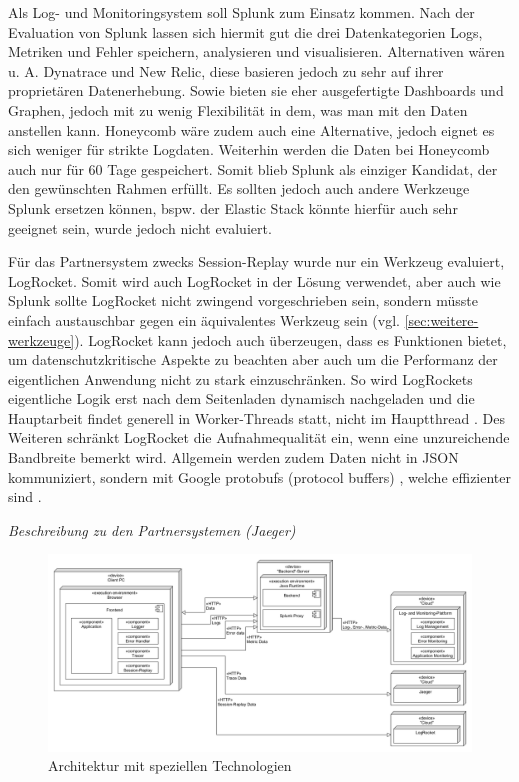 	Als Log- und Monitoringsystem soll Splunk zum Einsatz kommen. Nach der Evaluation von Splunk lassen sich hiermit gut die drei Datenkategorien Logs, Metriken und Fehler speichern, analysieren und visualisieren. Alternativen wären u. A. Dynatrace und New Relic, diese basieren jedoch zu sehr auf ihrer proprietären Datenerhebung. Sowie bieten sie eher ausgefertigte Dashboards und Graphen, jedoch mit zu wenig Flexibilität in dem, was man mit den Daten anstellen kann. Honeycomb wäre zudem auch eine Alternative, jedoch eignet es sich weniger für strikte Logdaten. Weiterhin werden die Daten bei Honeycomb auch nur für 60 Tage gespeichert. Somit blieb Splunk als einziger Kandidat, der den gewünschten Rahmen erfüllt. Es sollten jedoch auch andere Werkzeuge Splunk ersetzen können, bspw. der Elastic Stack könnte hierfür auch sehr geeignet sein, wurde jedoch nicht evaluiert.
	
	Für das Partnersystem zwecks Session-Replay wurde nur ein Werkzeug evaluiert, LogRocket. Somit wird auch LogRocket in der Lösung verwendet, aber auch wie Splunk sollte LogRocket nicht zwingend vorgeschrieben sein, sondern müsste einfach austauschbar gegen ein äquivalentes Werkzeug sein (vgl. \autoref{sec:weitere-werkzeuge}). LogRocket kann jedoch auch überzeugen, dass es Funktionen bietet, um datenschutzkritische Aspekte zu beachten aber auch um die Performanz der eigentlichen Anwendung nicht zu stark einzuschränken. So wird LogRockets eigentliche Logik erst nach dem Seitenladen dynamisch nachgeladen und die Hauptarbeit findet generell in Worker-Threads statt, nicht im Hauptthread \cite{LogRocketPerformance}. Des Weiteren schränkt LogRocket die Aufnahmequalität ein, wenn eine unzureichende Bandbreite bemerkt wird. Allgemein werden zudem Daten nicht in JSON kommuniziert, sondern mit Google protobufs (protocol buffers) \cite{GoogleProtobufs}, welche effizienter sind \cite{ComparisonDataSerializationFormats}.
	
	\textit{\color{red}Beschreibung zu den Partnersystemen (Jaeger)}
	
\begin{figure}[H]
	\centering
	\includegraphics[width=0.75\linewidth]{img/04_erstellung-poc/konzept-technologien.png}
	\caption{Architektur mit speziellen Technologien}
	\label{fig:architektur-technologien}
\end{figure}

